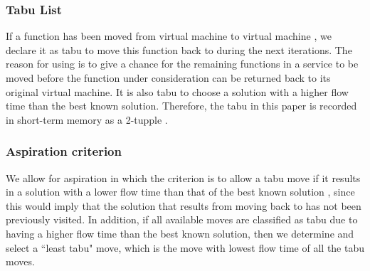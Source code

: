\documentclass[conference]{IEEEtran}
\begin{document}
\subsubsection{Tabu List} If a function  has been moved from virtual machine  to virtual machine , we declare it as tabu to move this function back to  during the next  iterations. The reason for using  is to give a chance for the remaining  functions in a service to be moved before the function under consideration can be returned back to its original virtual machine. It is also tabu to choose a solution with a higher flow time than the best known solution. Therefore, the tabu in this paper is recorded in short-term memory as a 2-tupple .
\subsubsection{Aspiration criterion}We allow for aspiration in which the criterion is to allow a tabu move if it results in a solution with a lower flow time than that of the best known solution , since this would imply that the solution that results from moving  back to  has not been previously visited. In addition, if all available moves are classified as tabu due to having a higher flow time than the best known solution, then we determine and select a ``least tabu" move, which is the move with lowest flow time of all the tabu moves.
\end{document}
